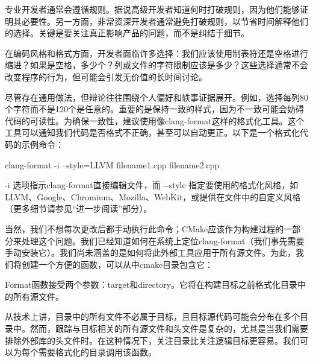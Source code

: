 专业开发者通常会遵循规则。据说高级开发者知道何时打破规则，因为他们能够证明其必要性。另一方面，非常资深开发者通常避免打破规则，以节省时间解释他们的选择。关键是要关注真正影响产品的问题，而不是纠结于细节。

在编码风格和格式方面，开发者面临许多选择：我们应该使用制表符还是空格进行缩进？如果是空格，多少个？列或文件的字符限制应该是多少？这些选择通常不会改变程序的行为，但可能会引发无价值的长时间讨论。

尽管存在通用做法，但辩论往往围绕个人偏好和轶事证据展开。例如，选择每列80个字符而不是120个是任意的。重要的是保持一致的样式，因为不一致可能会妨碍代码的可读性。为确保一致性，建议使用像clang-format这样的格式化工具。这个工具可以通知我们代码是否格式不正确，甚至可以自动更正。以下是一个格式化代码的示例命令：

\begin{shell}
clang-format -i --style=LLVM filename1.cpp filename2.cpp
\end{shell}


-i 选项指示clang-format直接编辑文件，而 -{}-style 指定要使用的格式化风格，如LLVM、Google、Chromium、Mozilla、WebKit，或提供在文件中的自定义风格（更多细节请参见“进一步阅读”部分）。

当然，我们不想每次更改后都手动执行此命令；CMake应该作为构建过程的一部分来处理这个问题。我们已经知道如何在系统上定位clang-format（我们事先需要手动安装它）。我们尚未涵盖的是如何将此外部工具应用于所有源文件。为此，我们将创建一个方便的函数，可以从中cmake目录包含它：



Format函数接受两个参数：target和directory。它将在构建目标之前格式化目录中的所有源文件。

从技术上讲，目录中的所有文件不必属于目标，且目标源代码可能会分布在多个目录中。然而，跟踪与目标相关的所有源文件和头文件是复杂的，尤其是当我们需要排除外部库的头文件时。在这种情况下，关注目录比关注逻辑目标更容易。我们可以为每个需要格式化的目录调用该函数。


